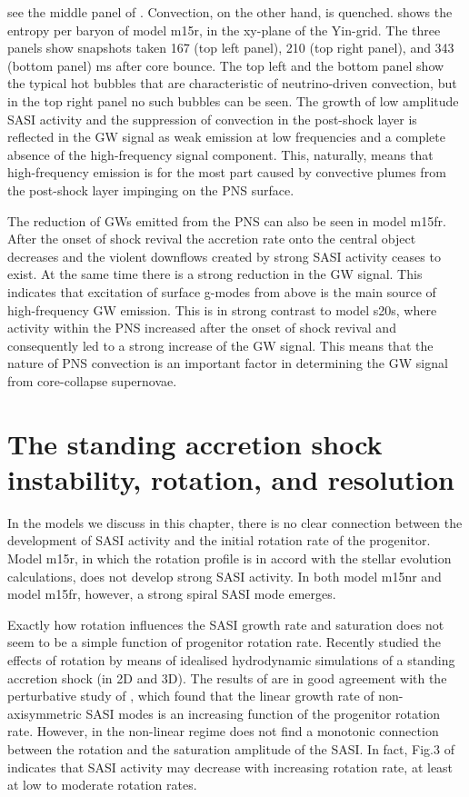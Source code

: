 see the middle panel of . Convection, on the other hand, is quenched. 
 shows the entropy per baryon of model m15r, in the xy-plane of the Yin-grid.
The three panels show snapshots taken 167 (top left panel), 210 (top right panel), and 343 (bottom panel) ms
after core bounce. The top left and the bottom panel show the typical hot bubbles that are characteristic of
neutrino-driven convection, but in the top right panel no such bubbles can be seen. 
The growth of low amplitude SASI activity and the suppression of convection in the post-shock layer is reflected
in the GW signal as weak emission at low frequencies and a complete absence of the high-frequency signal component.
This, naturally, means that high-frequency emission is for the most part caused by convective plumes from
the post-shock layer impinging on the PNS surface.

The reduction of GWs emitted from the PNS can also be seen in model m15fr. After the onset of shock revival
the accretion rate onto the central object decreases and the violent downflows created by strong SASI activity ceases to exist. At the same time there is a strong reduction in the GW signal. This indicates
that excitation of surface g-modes from above is the main source of high-frequency GW emission.
This is in strong contrast to model s20s, where activity within the PNS increased after
the onset of shock revival and consequently led to a strong increase of the GW signal.
This means that the nature of PNS convection is an important factor in determining the 
GW signal from core-collapse supernovae.

\section{The standing accretion shock instability, rotation, and resolution}
In the models we discuss in this chapter, there is no clear connection between the development of SASI activity and the initial rotation rate of
the progenitor. Model m15r, in which the rotation profile is in accord with the stellar
evolution calculations, does not develop strong SASI activity. In both model m15nr and model m15fr, however, a strong spiral SASI mode emerges. 

Exactly how rotation influences the SASI growth rate and saturation does not seem to be a simple function of progenitor rotation rate. Recently \cite{blondin_17} studied the effects of rotation by means of idealised hydrodynamic simulations of a standing accretion shock (in 2D and 3D). 
The results of \cite{blondin_17} are in good agreement with the perturbative study of \cite{yamasaki_08}, 
which found that the linear growth rate 
of non-axisymmetric SASI modes is an increasing function of the progenitor rotation rate.
However, in the non-linear regime \cite{kazeroni_17} does not find a monotonic connection between the
rotation and the saturation amplitude of the SASI. In fact, Fig.3 of \cite{kazeroni_17} indicates that
SASI activity may decrease with increasing rotation rate, at least at low to moderate rotation rates. 

